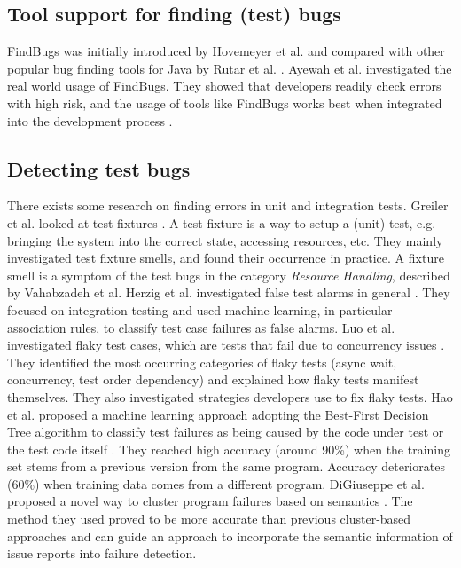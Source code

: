\documentclass{uvamscse}
\newcommand{\Atestbugs}{Vahabzadeh et al.}
\newcommand{\AFBEval}{Ayewah et al.}
\newcommand{\AFB}{Hovemeyer et al.}
\newcommand{\AComparisonBugTools}{Rutar et al.}
\newcommand{\Afixture}{Greiler et al.}
\newcommand{\Aobsolete}{Hao et al.}
\newcommand{\AfalseAlarms}{Herzig et al.}
\newcommand{\Aflaky}{Luo et al.}
\newcommand{\AclusterFailure}{DiGiuseppe et al.}
\begin{document}
\subsection{Tool support for finding (test) bugs}
FindBugs was initially introduced by \AFB{} \cite{hovemeyer2004finding} and compared with other popular bug finding tools for Java by \AComparisonBugTools{} \cite{rutar2004comparison}. \AFBEval{} investigated the real world usage of FindBugs. They showed that developers readily check errors with high risk, and the usage of tools like FindBugs works best when integrated into the development process \cite{ayewah2008using}. 

\subsection{Detecting test bugs}
There exists some research on finding errors in unit and integration tests. \Afixture{} looked at test fixtures \cite{greiler2013automated}. A test fixture is a way to setup a (unit) test, e.g. bringing the system into the correct state, accessing resources, etc. They mainly investigated test fixture smells, and found their occurrence in practice. A fixture smell is a symptom of the test bugs in the category \textit{Resource Handling}, described by \Atestbugs{} \AfalseAlarms{} investigated false test alarms in general \cite{herzig2015empirically}. They focused on integration testing and used machine learning, in particular association rules, to classify test case failures as false alarms. \Aflaky{} investigated flaky test cases, which are tests that fail due to concurrency issues \cite{luo2014empirical}. They identified the most occurring categories of flaky tests (async wait, concurrency, test order dependency) and explained how flaky tests manifest themselves. They also investigated strategies developers use to fix flaky tests. \Aobsolete{} proposed a machine learning approach adopting the Best-First Decision Tree algorithm to classify test failures as being caused by the code under test or the test code itself \cite{hao2013bug}. They reached high accuracy (around 90\%) when the training set stems from a previous version from the same program. Accuracy deteriorates (60\%) when training data comes from a different program. \AclusterFailure{} proposed a novel way to cluster program failures based on semantics \cite{digiuseppe2012concept}. The method they used proved to be more accurate than previous cluster-based approaches and can guide an approach to incorporate the semantic information of issue reports into failure detection. 
\end{document}
